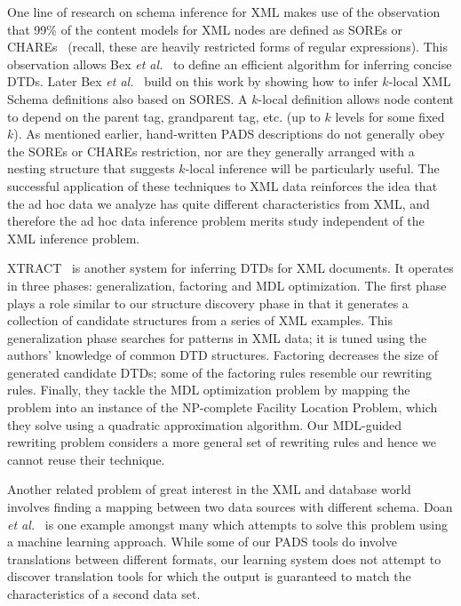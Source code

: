One line of research on schema inference for XML makes use of the 
observation that 99\% of the content models for XML nodes are defined as
SOREs or CHAREs~\cite{martens+:expressiveness-xml-schema} (recall, these
are heavily restricted forms of regular expressions).  
This observation allows Bex {\em et al.}~\cite{bex+:dtd-inference} to define
an efficient algorithm for inferring concise DTDs.  Later 
Bex {\em et al.}~\cite{bex+:inferring-xml-schema} build on this work 
by showing how to infer $k$-local XML Schema definitions also based on
SORES.  A $k$-local definition allows node content to depend on the parent
tag, grandparent tag, etc. (up to $k$ levels for some fixed $k$).
As mentioned earlier, hand-written PADS descriptions do not generally obey
the SOREs or CHAREs restriction, nor are they generally arranged with a nesting
structure that suggests $k$-local inference will be particularly useful.
The successful application of these techniques to XML data reinforces 
the idea that the ad hoc data we analyze has quite different characteristics
from XML, and therefore the ad hoc data inference problem merits study
independent of the XML inference problem.

XTRACT~\cite{garofalakis+:xtract} is another system for inferring DTDs
for XML documents.  It operates in three phases: generalization,
factoring and MDL optimization.  The first phase plays a role similar to
our structure discovery phase in that it generates a
collection of candidate structures from a series of XML examples.
This generalization phase searches for patterns in XML
data; it is tuned using the authors' knowledge of common DTD
structures.  Factoring decreases the size of generated candidate DTDs;
some of the factoring rules resemble our rewriting rules.
Finally, they tackle the MDL optimization problem by mapping the
problem into an instance of the NP-complete Facility Location Problem,
which they solve using a quadratic approximation algorithm.
Our MDL-guided rewriting problem considers a more general set of
rewriting rules and hence we cannot reuse their technique.

Another related problem of great interest in the XML and database world
involves finding a mapping between two data sources with different schema.
Doan {\em et al.}~\cite{doan+:disparate-data-sources} is one example amongst
many which attempts to solve this problem using a machine learning approach.
While some of our PADS tools do involve translations between
different formats, our learning system does not attempt to discover
translation tools for which the output is guaranteed to match 
the characteristics of a second data set.


